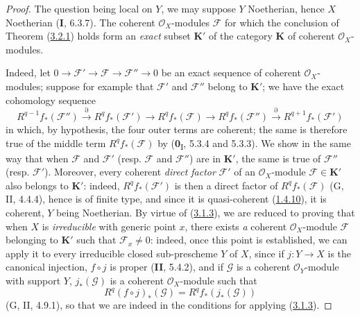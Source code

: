 \begin{proof}
The question being local on $Y$, we may suppose $Y$ Noetherian, hence $X$
Noetherian (\textbf{I}, 6.3.7). The coherent $\mathcal O_X$-modules $\mathcal F$ for
which the conclusion of Theorem (\hyperref[III.3.2.1]{3.2.1}) holds
form an \emph{exact} subset $\boldsymbol{K}'$ of the category $\boldsymbol{K}$ of coherent
$\mathcal O_X$-modules.

Indeed, let
$0\to\mathcal F'\to\mathcal F\to\mathcal F''\to0$ be an exact sequence of
coherent $\mathcal O_X$-modules; suppose for example that $\mathcal F'$
and $\mathcal F''$ belong to $\boldsymbol{K}'$; we have the exact cohomology sequence
\[
R^{q-1}f_*(\mathcal F'')\xrightarrow{\partial}R^qf_*(\mathcal F')
\longrightarrow R^qf_*(\mathcal F)\longrightarrow R^qf_*(\mathcal F'')
\xrightarrow{\partial}R^{q+1}f_*(\mathcal F')
\]
in which, by hypothesis, the four outer terms are coherent; the same is
therefore true of the middle term $R^qf_*(\mathcal F)$ by
(\textbf{0}\textsubscript{I}, 5.3.4 and 5.3.3). We show in the same way that
when $\mathcal F$ and $\mathcal F'$ (resp. $\mathcal F$ and
$\mathcal F''$) are in $\boldsymbol{K}'$, the same is true of $\mathcal F''$ (resp.
$\mathcal F'$). Moreover, every coherent \emph{direct factor} $\mathcal F'$
of an $\mathcal O_X$-module $\mathcal F\in\boldsymbol{K}'$ also belongs to $\boldsymbol{K}'$:
indeed, $R^qf_*(\mathcal F')$ is then a direct factor of
$R^qf_*(\mathcal F)$ (G, II, 4.4.4), hence is of finite type, and since it is
quasi-coherent (\hyperref[III.1.4.10]{1.4.10}), it is coherent, $Y$
being Noetherian. By virtue of (\hyperref[III.3.1.3]{3.1.3}), we are
reduced to proving that when $X$ is \emph{irreducible} with generic point
$x$, there exists \emph{a} coherent $\mathcal O_X$-module $\mathcal F$ belonging to
$\boldsymbol{K}'$ such that $\mathcal F_x\neq0$: indeed, once this point is established,
we can apply it to every irreducible closed sub-prescheme $Y$ of $X$, since
if $j:Y\to X$ is the canonical injection, $f\circ j$ is proper (\textbf{II}, 5.4.2),
and if $\mathcal G$ is a coherent $\mathcal O_Y$-module with support $Y$,
$j_*(\mathcal G)$ is a coherent $\mathcal O_X$-module such that
\[
R^q(f\circ j)_*(\mathcal G)=R^qf_*(j_*(\mathcal G))
\]
(G, II, 4.9.1), so that we are indeed in the conditions for applying
(\hyperref[III.3.1.3]{3.1.3}).


\end{proof}
